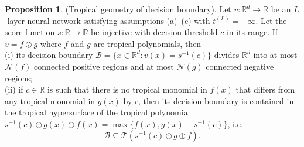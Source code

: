 \documentclass{article}
\theoremstyle{definition}
\newtheorem{proposition}[theorem]{Proposition}
\begin{document}
\begin{proposition}\hspace{1sp}\cite{zhang2018tropical}(Tropical geometry of decision boundary).
\label{prop:geom_of_dec_boundary}
Let $v : \mathbb{R}^{d} \to \mathbb{R}$ be an $L$-layer neural network satisfying assumptions (a)–(c) with $t^{(L)}=-\infty$. Let the score function $s: \mathbb{R} \to \mathbb{R}$ be injective with decision threshold $c$ in its range. If $v = f \oslash g$ where $f$ and $g$ are tropical polynomials, then \\
(i) its decision boundary $\mathcal{B}=\{ x \in \mathbb{R}^{d} : v(x) = s^{-1}(c)\}$ divides $\mathbb{R}^{d}$ into at most $\mathcal{N} (f)$ connected positive regions and at most $\mathcal{N}(g)$ connected negative regions; \\
(ii) if $c \in \mathbb{R}$ is such that there is no tropical monomial in $f(x)$ that differs from any tropical monomial in $g(x)$ by $c$, then its decision boundary is contained in the tropical hypersurface of the tropical polynomial $s^{-1}(c) \odot g(x) \oplus f(x) = \max\{f(x), g(x) + s^{-1}(c)\}$, i.e.
$$\mathcal{B} \subseteq \mathcal{T} (s^{-1}(c) \odot g \oplus f).$$
\end{proposition}
\end{document}
